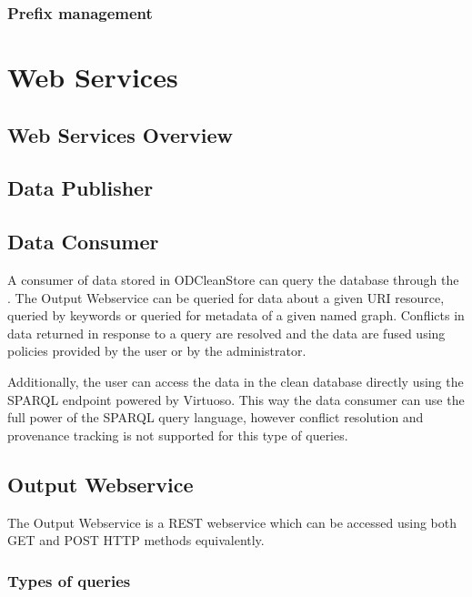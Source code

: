 \subsection{Prefix management}
\label{sec:frontendPrefixMgmt}


\chapter{Web Services}

\section{Web Services Overview}

\section{Data Publisher}
\label{sec:inputWS}

\section{Data Consumer}
\label{sec:outputWS}

A consumer of data stored in ODCleanStore can query the database through the . The Output Webservice can be queried for data about a given URI resource, queried by keywords or queried for metadata of a given named graph. Conflicts in data returned in response to a query are resolved and the data are fused using policies provided by the user or by the administrator.

Additionally, the user can access the data in the clean database directly using the SPARQL endpoint powered by Virtuoso. This way the data consumer can use the full power of the SPARQL query language, however conflict resolution and provenance tracking is not supported for this type of queries.

\section*{Output Webservice}

The Output Webservice is a REST webservice which can be accessed using both GET and POST HTTP methods equivalently.

\subsection{Types of queries}


